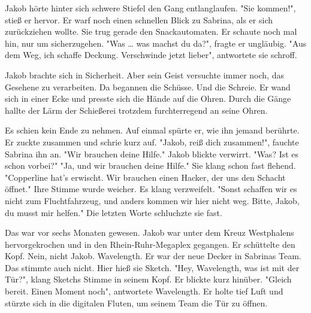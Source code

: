 \documentclass[a4paper, 10pt, twocolumn, twoside]{book}
\newcommand{\storypar}{
  \begin{center}
  \resizebox{3mm}{!}{$\textcolor{redtext}\ast$}
  \end{center}
}
\begin{document}
Jakob hörte hinter sich schwere Stiefel den Gang entlanglaufen.
"Sie kommen!", stieß er hervor. Er warf noch einen schnellen Blick zu Sabrina, als er sich zurückziehen wollte. Sie trug gerade den Snackautomaten. Er schaute noch mal hin, nur um sicherzugehen.
"Was … was machst du da?", fragte er ungläubig.
"Aus dem Weg, ich schaffe Deckung. Verschwinde jetzt lieber", antwortete sie schroff.

Jakob brachte sich in Sicherheit. Aber sein Geist versuchte immer noch, das Gesehene zu verarbeiten. Da begannen die Schüsse. Und die Schreie.
Er wand sich in einer Ecke und presste sich die Hände auf die Ohren. Durch die Gänge hallte der Lärm der Schießerei trotzdem furchterregend an seine Ohren.

Es schien kein Ende zu nehmen. Auf einmal spürte er, wie ihn jemand berührte. Er zuckte zusammen und schrie kurz auf.
"Jakob, reiß dich zusammen!", fauchte Sabrina ihn an. "Wir brauchen deine Hilfe."
Jakob blickte verwirrt. "Was? Ist es schon vorbei?"
"Ja, und wir brauchen deine Hilfe." Sie klang schon fast flehend. "Copperline hat’s erwischt. Wir brauchen einen Hacker, der uns den Schacht öffnet." Ihre Stimme wurde weicher. Es klang verzweifelt. "Sonst schaffen wir es nicht zum Fluchtfahrzeug, und anders kommen wir hier nicht weg. Bitte, Jakob, du musst mir helfen." Die letzten Worte schluchzte sie fast.
\storypar
Das war vor sechs Monaten gewesen. Jakob war unter dem Kreuz Westphalens hervorgekrochen und in den Rhein-Ruhr-Megaplex gegangen. Er schüttelte den Kopf. Nein, nicht Jakob. Wavelength. Er war der neue Decker in Sabrinas Team. Das stimmte auch nicht. Hier hieß sie Sketch.
"Hey, Wavelength, was ist mit der Tür?", klang Sketchs Stimme in seinem Kopf. Er blickte kurz hinüber.
"Gleich bereit. Einen Moment noch", antwortete Wavelength. Er holte tief Luft und stürzte sich in die digitalen Fluten, um seinem Team die Tür zu öffnen. 
\end{document}
